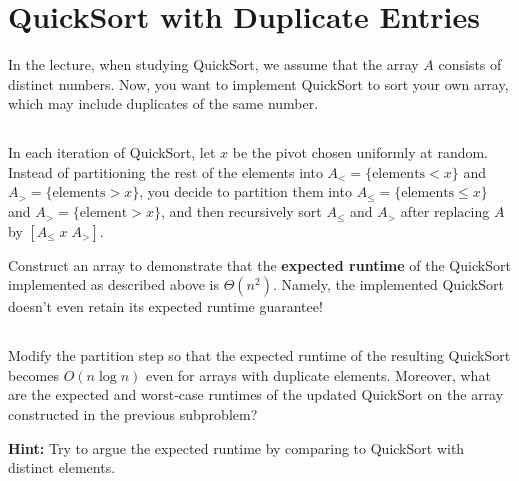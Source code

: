 \documentclass[12pt]{article}
\begin{document}
\section{QuickSort with Duplicate Entries}

In the lecture, when studying QuickSort, we assume that the array $A$ consists of distinct numbers.
Now, you want to implement QuickSort to sort your own array, which may include duplicates of the same number.

\subsection{}

In each iteration of QuickSort, let $x$ be the pivot chosen uniformly at random.
Instead of partitioning the rest of the elements into $A_< = \{\text{elements} < x\}$ and $A_> = \{\text{elements} > x\}$, you decide to partition them into $A_{\leq} = \{\text{elements} \leq x\}$ and $A_> = \{\text{element} > x\}$, and then recursively sort $A_{\leq}$ and $A_>$ after replacing $A$ by $[A_{\leq} \; x \; A_>]$.

Construct an array to demonstrate that the \textbf{expected runtime} of the QuickSort implemented as described above is $\Theta(n^2)$.
Namely, the implemented QuickSort doesn't even retain its expected runtime guarantee!


\subsection{}

Modify the partition step so that the expected runtime of the resulting QuickSort becomes $O(n \log n)$ even for arrays with duplicate elements.
Moreover, what are the expected and worst-case runtimes of the updated QuickSort on the array constructed in the previous subproblem?

\textbf{Hint:} Try to argue the expected runtime by comparing to QuickSort with distinct elements.

    
\end{document}
